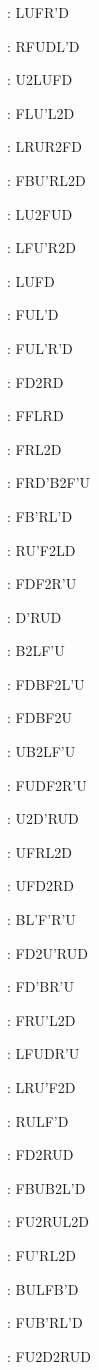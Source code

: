 \documentclass[9pt]{article}
\begin{document}
{\begin{multicols}{6}
: LUFR'D

: RFUDL'D

: U2LUFD

: FLU'L2D

: LRUR2FD

: FBU'RL2D

: LU2FUD

: LFU'R2D

: LUFD

: FUL'D

: FUL'R'D

: FD2RD

: FFLRD

: FRL2D

: FRD'B2F'U

: FB'RL'D

: RU'F2LD

: FDF2R'U

: D'RUD

: B2LF'U

: FDBF2L'U

: FDBF2U

: UB2LF'U

: FUDF2R'U

: U2D'RUD

: UFRL2D

: UFD2RD

: BL'F'R'U

: FD2U'RUD

: FD'BR'U

: FRU'L2D

: LFUDR'U

: LRU'F2D

: RULF'D

: FD2RUD

: FBUB2L'D

: FU2RUL2D

: FU'RL2D

: BULFB'D

: FUB'RL'D

: FU2D2RUD


\end{multicols}}
\end{document}
